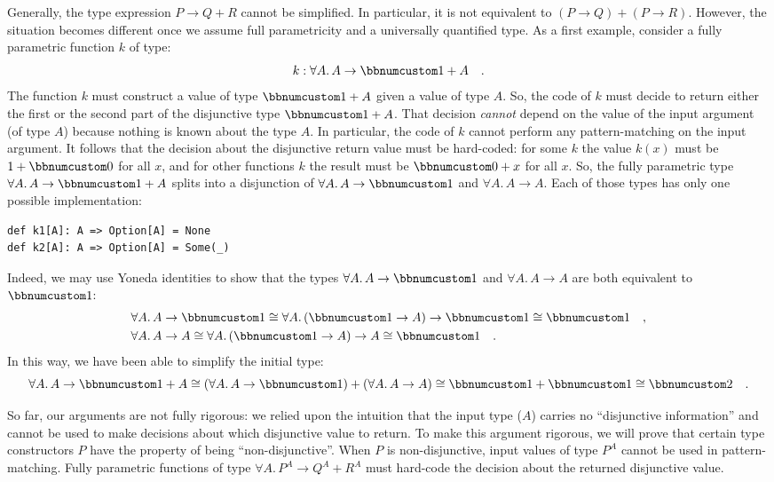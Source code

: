 Generally, the type expression $P\rightarrow Q+R$ cannot be simplified.
In particular, it is not equivalent to $(P\rightarrow Q)+(P\rightarrow R)$.
However, the situation becomes different once we assume full parametricity
and a universally quantified type. As a first example, consider a
fully parametric function $k$ of type:
\[
k:\forall A.\,A\rightarrow\bbnum 1+A\quad.
\]
The function $k$ must construct a value of type $\bbnum 1+A$ given
a value of type $A$. So, the code of $k$ must decide to return either
the first or the second part of the disjunctive type $\bbnum 1+A$.
That decision \emph{cannot} depend on the value of the input argument
(of type $A$) because nothing is known about the type $A$. In particular,
the code of $k$ cannot perform any pattern-matching on the input
argument. It follows that the decision about the disjunctive return
value must be hard-coded: for some $k$ the value $k(x)$ must be
$1+\bbnum 0$ for all $x$, and for other functions $k$ the result
must be $\bbnum 0+x$ for all $x$. So, the fully parametric type
$\forall A.\,A\rightarrow\bbnum 1+A$ splits into a disjunction of
$\forall A.\,A\rightarrow\bbnum 1$ and $\forall A.\,A\rightarrow A$.
Each of those types has only one possible implementation:
\begin{lstlisting}
def k1[A]: A => Option[A] = None
def k2[A]: A => Option[A] = Some(_)
\end{lstlisting}
Indeed, we may use Yoneda identities to show that the types $\forall A.\,A\rightarrow\bbnum 1$
and $\forall A.\,A\rightarrow A$ are both equivalent to $\bbnum 1$:
\begin{align*}
 & \forall A.\,A\rightarrow\bbnum 1\cong\forall A.\,(\bbnum 1\rightarrow A)\rightarrow\bbnum 1\cong\bbnum 1\quad,\\
 & \forall A.\,A\rightarrow A\cong\forall A.\,(\bbnum 1\rightarrow A)\rightarrow A\cong\bbnum 1\quad.
\end{align*}
In this way, we have been able to simplify the initial type:
\[
\forall A.\,A\rightarrow\bbnum 1+A\cong(\forall A.\,A\rightarrow\bbnum 1)+(\forall A.\,A\rightarrow A)\cong\bbnum 1+\bbnum 1\cong\bbnum 2\quad.
\]

So far, our arguments are not fully rigorous: we relied upon the intuition
that the input type ($A$) carries no \textsf{``}disjunctive information\textsf{''}
and cannot be used to make decisions about which disjunctive value
to return. To make this argument rigorous, we will prove that certain
type constructors $P$ have the property of being \textsf{``}non-disjunctive\textsf{''}.
When $P$ is non-disjunctive, input values of type $P^{A}$ cannot
be used in pattern-matching. Fully parametric functions of type $\forall A.\,P^{A}\rightarrow Q^{A}+R^{A}$
must hard-code the decision about the returned disjunctive value.

